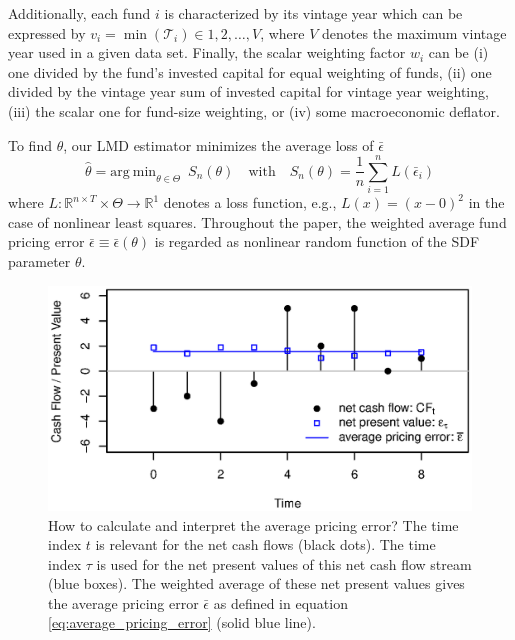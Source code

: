 \documentclass[12pt]{article}
\begin{document}
Additionally, each fund $i$ is characterized by its vintage year which can be expressed by $v_{i}=\min(\mathcal{T}_i) \in 1,2,\dots,V$, where $V$ denotes the maximum vintage year used in a given data set.
Finally, the scalar weighting factor $w_i$ can be (i) one divided by the fund's invested capital for equal weighting of funds, (ii) one divided by the vintage year sum of invested capital for vintage year weighting, (iii) the scalar one for fund-size weighting, or (iv) some macroeconomic deflator.

To find $\theta$, our LMD estimator \cite[equation 7.1]{PP97} minimizes the average loss of $\bar{\epsilon}$
\begin{equation}
\label{eq:estimator}
\hat{\theta} = 
\mathrm{arg \ min}_{\theta \in \Theta}
\enspace
S_n(\theta)
\quad
\mathrm{with}
\quad
S_n(\theta) = 
\frac{1}{n}
\sum_{i=1}^n
L \left( \bar{\epsilon}_{i} \right) 
\end{equation}
where $L: \mathbb{R}^{n \times T} \times \Theta \rightarrow \mathbb{R}^1$ denotes a loss function, e.g., $L(x)=(x-0)^2$ in the case of nonlinear least squares.
Throughout the paper, the weighted average fund pricing error $\bar{\epsilon} \equiv \bar{\epsilon}(\theta)$ is regarded as nonlinear random function of the SDF parameter $\theta$.

\begin{figure}[ht]
	\centering
	\includegraphics{eps/npvs.eps}
	\caption{
		How to calculate and interpret the average pricing error?
		The time index $t$ is relevant for the net cash flows (black dots).
		The time index $\tau$ is used for the net present values of this net cash flow stream (blue boxes).
		The weighted average of these net present values gives the average pricing error $\bar{\epsilon}$ as defined in equation \ref{eq:average_pricing_error} (solid blue line).
	}
	\label{fig:npvs}
\end{figure}
\end{document}
